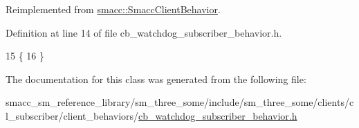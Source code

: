 Reimplemented from \hyperlink{classsmacc_1_1SmaccClientBehavior_a7962382f93987c720ad432fef55b123f}{smacc\+::\+Smacc\+Client\+Behavior}.



Definition at line 14 of file cb\+\_\+watchdog\+\_\+subscriber\+\_\+behavior.\+h.


\begin{DoxyCode}
15     \{
16     \}
\end{DoxyCode}


The documentation for this class was generated from the following file\+:\begin{DoxyCompactItemize}
\item 
smacc\+\_\+sm\+\_\+reference\+\_\+library/sm\+\_\+three\+\_\+some/include/sm\+\_\+three\+\_\+some/clients/cl\+\_\+subscriber/client\+\_\+behaviors/\hyperlink{sm__three__some_2include_2sm__three__some_2clients_2cl__subscriber_2client__behaviors_2cb__watchdog__subscriber__behavior_8h}{cb\+\_\+watchdog\+\_\+subscriber\+\_\+behavior.\+h}\end{DoxyCompactItemize}
